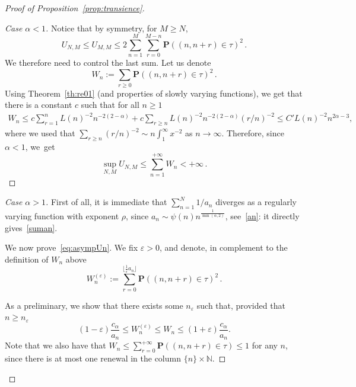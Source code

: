 \documentclass[11pt]{article}
\theoremstyle{definition}
\newenvironment{proofc}{\begin{proof}}{\end{proof}}
\numberwithin{equation}{section}
\numberwithin{figure}{section}
\numberwithin{table}{section}
\newenvironment{step}[1]{\begin{proof}[#1]}{\let\qed\relax\end{proof}}
\newcommand{\ga}{\alpha}
\newcommand{\gep}{\varepsilon}
\newcommand{\bP}{\ensuremath{\mathbf{P}}}
\newcommand{\bbN}{\ensuremath{\mathbb{N}}}
\begin{document}
\begin{appendix}
\begin{proofc}[Proof of Proposition~\ref{prop:transience}]

\begin{step}{Case $\ga<1$}
Notice that by symmetry, for $M\geq N$,
\[
U_{N,M} \leq U_{M,M} \leq 2 \sum_{n=1}^M \sum_{r=0}^{M-n} \bP((n,n+r) \in\tau)^2\,.
\]
We therefore need to control the last sum. Let us denote
\[
W_n:=\sum_{r\geq 0} \bP((n,n+r) \in\tau)^2\,.
\]
Using Theorem~\ref{th:re01} (and properties of slowly varying functions), we get that there is a constant $c$ such that for all $n\geq 1$
\begin{align*}
W_n \leq c\sum_{r=1}^n L(n)^{-2} n^{-2(2-\ga)} + c\sum_{r\geq n} L(n)^{-2} n^{-2(2-\ga)} (r/n)^{-2}
\leq C' L(n)^{-2} n^{ 2\ga -3},
\end{align*}
where we used that $\sum_{r\geq n} (r/n)^{-2} \sim n \int_1^{\infty} x^{-2}$ as $n\to\infty$. Therefore, since $\ga<1$, we~get
\[
\sup_{N,M} U_{N,M} \leq \sum_{n=1}^{+\infty} W_n <+\infty\,.
\]
\end{step}

\begin{step}{Case $\ga > 1$}
First of all, it is immediate that $\sum_{n=1}^N 1/a_n$ diverges as a regularly varying function with exponent $\rho$, since $a_n \sim \psi(n) n^{\frac{1}{\min(\ga,2)}}$, see~\eqref{an}: it directly gives~\eqref{suman}.



We now prove~\eqref{eq:asympUn}. We fix $\gep>0$, and denote, in complement to the definition of $W_n$ above
\[
W_n^{(\gep)} := \sum_{r = 0}^{\lfloor \frac1\gep a_n \rfloor} \bP((n,n+r) \in \tau)^2\,.
\]


As a preliminary, we show that there exists some $n_\gep$ such that, provided that~$n\geq n_{\gep}$
\begin{equation}\label{eq:sumk}
(1-\gep) \frac{c_{\ga}}{a_n} \leq W_n^{(\gep)} \leq W_n \leq (1+\gep) \frac{c_{\ga}}{a_n}.
\end{equation}
Note that we also have that $W_n \leq \sum_{r = 0}^{+\infty} \bP((n,n+r) \in \tau) \leq 1$ for any $n$, since there is at most one renewal in the column $\{n\}\times \bbN$.



\end{step}
\end{proofc}
\end{appendix}
\end{document}
